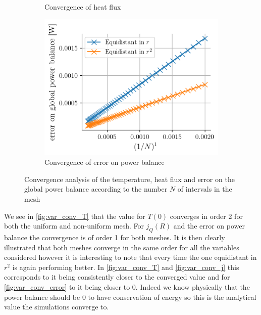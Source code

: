 \begin{figure}[H]
\begin{subfigure}{0.48\linewidth}
        \caption{Convergence of heat flux}
        \label{fig:var_conv_j}
    \end{subfigure}
    \begin{subfigure}{0.48\linewidth}
        \centering
        \includegraphics[width=\linewidth]{figures/var_conv_error.png}
        \caption{Convergence of error on power balance}
        \label{fig:var_conv_error}
    \end{subfigure}
    \caption{Convergence analysis of the temperature, heat flux and error on the global power balance according to the number $N$ of intervals in the mesh}
    \label{fig:var_convergence}
\end{figure}

We see in \autoref{fig:var_conv_T} that the value for $T(0)$ converges in order 2 for both the uniform and non-uniform mesh. For $j_Q(R)$ and the error on power balance the convergence is of order 1 for both meshes. It is then clearly illustrated that both meshes converge in the same order for all the variables considered however it is interesting to note that every time the one equidistant in $r^2$ is again performing better. In \autoref{fig:var_conv_T} and \autoref{fig:var_conv_j} this corresponds to it being consistently closer to the converged value and for \autoref{fig:var_conv_error} to it being closer to 0. Indeed we know physically that the power balance should be 0 to have conservation of energy so this is the analytical value the simulations converge to.

